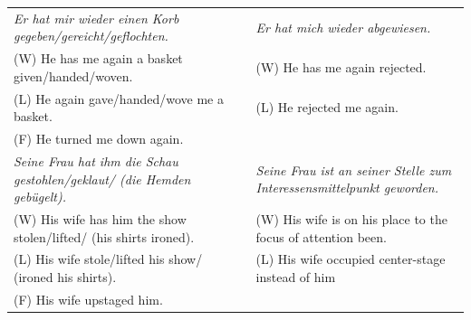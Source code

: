 \begin{table}[]
{\begin{tabular}{|p{4in}|p{4in}|}
\textit{Er hat mir wieder einen Korb gegeben/gereicht/geflochten.}              & \textit{Er hat mich wieder abgewiesen.}                                       \\
\hspace{3mm}(W) He has me again a basket given/handed/woven.                                & \hspace{3mm}(W) He has me again rejected.                                                 \\
\hspace{3mm}(L) He again gave/handed/wove me a basket.                                      & \hspace{3mm}(L) He rejected me again.                                                     \\
\hspace{3mm}(F) He turned me down again.                                                    &                                                                               \\ \hline
\textit{Seine Frau hat ihm die Schau gestohlen/geklaut/ (die Hemden gebügelt).} & \textit{Seine Frau ist an seiner Stelle zum Interessensmittelpunkt geworden.} \\
\hspace{3mm}(W) His wife has him the show stolen/lifted/ (his shirts ironed).               & \hspace{3mm}(W) His wife is on his place to the focus of attention been.                  \\
\hspace{3mm}(L) His wife stole/lifted his show/ (ironed his shirts).                        & \hspace{3mm}(L) His wife occupied center-stage instead of him                             \\
\hspace{3mm}(F) His wife upstaged him.                                                      &                                                                               \\ \hline
\end{tabular}}

\end{table}



